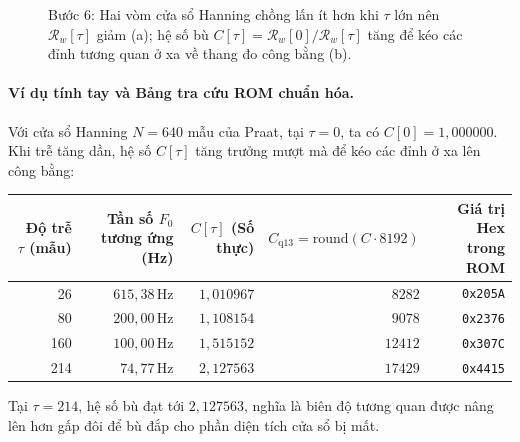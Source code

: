 \begin{figure}[H]
\centering
{}
\caption{Bước 6: Hai vòm cửa sổ Hanning chồng lấn ít hơn khi $\tau$ lớn nên $\mathcal{R}_w[\tau]$ giảm (a); hệ số bù $C[\tau] = \mathcal{R}_w[0] / \mathcal{R}_w[\tau]$ tăng để kéo các đỉnh tương quan ở xa về thang đo công bằng (b).}
\label{fig:ch01_window_norm}
\end{figure}

\paragraph{Ví dụ tính tay và Bảng tra cứu ROM chuẩn hóa.}
Với cửa sổ Hanning $N = 640$ mẫu của Praat, tại $\tau = 0$, ta có $C[0] = 1{,}000000$.
Khi trễ tăng dần, hệ số $C[\tau]$ tăng trưởng mượt mà để kéo các đỉnh ở xa lên công bằng:
\begin{center}\small
\begin{tabular}{@{}rrrrr@{}}\toprule
Độ trễ $\tau$ (mẫu) & Tần số $F_0$ tương ứng (Hz) & $C[\tau]$ (Số thực) & $C_{\mathrm{q13}} = \mathrm{round}(C \cdot 8192)$ & Giá trị Hex trong ROM \\
\midrule
26 & $615{,}38\,\text{Hz}$ & $1{,}010967$ & $8282$ & \texttt{0x205A} \\
80 & $200{,}00\,\text{Hz}$ & $1{,}108154$ & $9078$ & \texttt{0x2376} \\
160 & $100{,}00\,\text{Hz}$ & $1{,}515152$ & $12412$ & \texttt{0x307C} \\
214 & $74{,}77\,\text{Hz}$ & $2{,}127563$ & $17429$ & \texttt{0x4415} \\
\bottomrule
\end{tabular}
\end{center}
Tại $\tau = 214$, hệ số bù đạt tới $2{,}127563$, nghĩa là biên độ tương quan được nâng lên hơn gấp đôi để bù đắp cho phần diện tích cửa sổ bị mất.

